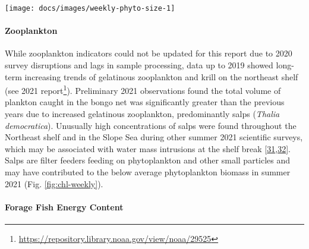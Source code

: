 \documentclass[
  10pt,
]{article}
\let\origfigure\figure
\let\endorigfigure\endfigure
\renewenvironment{figure}[1][2] {
    \expandafter\origfigure\expandafter[H]
} {
    \endorigfigure
}
\begin{document}
\begin{figure}

{\centering \texttt{[image: docs/images/weekly-phyto-size-1]} 

}

\caption{The annual climatology (1998-2020) percent composition of the phytoplankton size classes in the Mid-Atlantic based on satellite observations in the shaded portions.  The 2021 proportions for the microplankton (>20 microns, green) and nanoplankton (2-20 microns, orange) are shown in the bold lines.}\label{fig:weekly-phyto-size}
\end{figure}

\hypertarget{zooplankton}{%
\paragraph{Zooplankton}\label{zooplankton}}

While zooplankton indicators could not be updated for this report due to
2020 survey disruptions and lags in sample processing, data up to 2019
showed long-term increasing trends of gelatinous zooplankton and krill
on the northeast shelf (see 2021 report\footnote{\url{https://repository.library.noaa.gov/view/noaa/29525}}).
Preliminary 2021 observations found the total volume of plankton caught
in the bongo net was significantly greater than the previous years due
to increased gelatinous zooplankton, predominantly salps (\emph{Thalia
democratica}). Unusually high concentrations of salps were found
throughout the Northeast shelf and in the Slope Sea during other summer
2021 scientific surveys, which may be associated with water mass
intrusions at the shelf break
{[}\protect\hyperlink{ref-madin_periodic_2006}{31},\protect\hyperlink{ref-deibel_predictability_2009}{32}{]}.
Salps are filter feeders feeding on phytoplankton and other small
particles and may have contributed to the below average phytoplankton
biomass in summer 2021 (Fig. \ref{fig:chl-weekly}).

\hypertarget{forage-fish-energy-content}{%
\paragraph{Forage Fish Energy
Content}\label{forage-fish-energy-content}}
\end{document}
